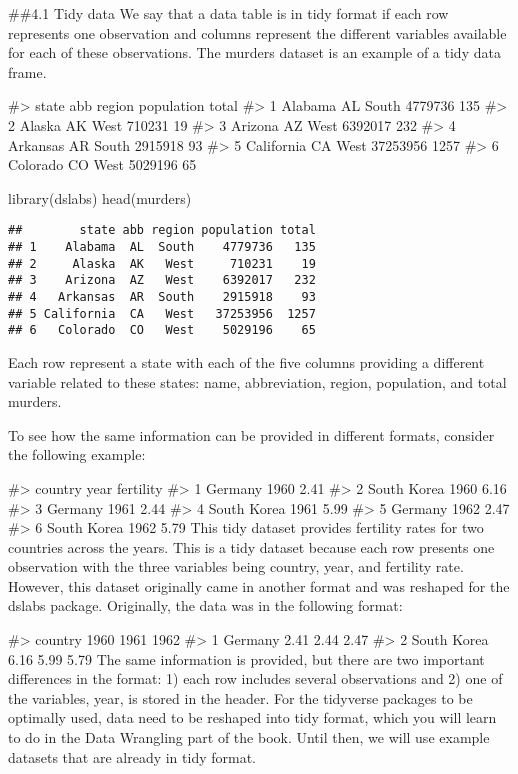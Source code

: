 \documentclass[
]{article}
\newenvironment{Shaded}{\begin{snugshade}}{\end{snugshade}}
\newcommand{\FunctionTok}[1]{\textcolor[rgb]{0.00,0.00,0.00}{#1}}
\newcommand{\NormalTok}[1]{#1}
\begin{document}
\#\#4.1 Tidy data We say that a data table is in tidy format if each row
represents one observation and columns represent the different variables
available for each of these observations. The murders dataset is an
example of a tidy data frame.

\#\textgreater{} state abb region population total \#\textgreater{} 1
Alabama AL South 4779736 135 \#\textgreater{} 2 Alaska AK West 710231 19
\#\textgreater{} 3 Arizona AZ West 6392017 232 \#\textgreater{} 4
Arkansas AR South 2915918 93 \#\textgreater{} 5 California CA West
37253956 1257 \#\textgreater{} 6 Colorado CO West 5029196 65

\begin{Shaded}
\begin{Highlighting}[]
\FunctionTok{library}\NormalTok{(dslabs)}
\FunctionTok{head}\NormalTok{(murders)}
\end{Highlighting}
\end{Shaded}

\begin{verbatim}
##        state abb region population total
## 1    Alabama  AL  South    4779736   135
## 2     Alaska  AK   West     710231    19
## 3    Arizona  AZ   West    6392017   232
## 4   Arkansas  AR  South    2915918    93
## 5 California  CA   West   37253956  1257
## 6   Colorado  CO   West    5029196    65
\end{verbatim}

Each row represent a state with each of the five columns providing a
different variable related to these states: name, abbreviation, region,
population, and total murders.

To see how the same information can be provided in different formats,
consider the following example:

\#\textgreater{} country year fertility \#\textgreater{} 1 Germany 1960
2.41 \#\textgreater{} 2 South Korea 1960 6.16 \#\textgreater{} 3 Germany
1961 2.44 \#\textgreater{} 4 South Korea 1961 5.99 \#\textgreater{} 5
Germany 1962 2.47 \#\textgreater{} 6 South Korea 1962 5.79 This tidy
dataset provides fertility rates for two countries across the years.
This is a tidy dataset because each row presents one observation with
the three variables being country, year, and fertility rate. However,
this dataset originally came in another format and was reshaped for the
dslabs package. Originally, the data was in the following format:

\#\textgreater{} country 1960 1961 1962 \#\textgreater{} 1 Germany 2.41
2.44 2.47 \#\textgreater{} 2 South Korea 6.16 5.99 5.79 The same
information is provided, but there are two important differences in the
format: 1) each row includes several observations and 2) one of the
variables, year, is stored in the header. For the tidyverse packages to
be optimally used, data need to be reshaped into tidy format, which you
will learn to do in the Data Wrangling part of the book. Until then, we
will use example datasets that are already in tidy format.
\end{document}
